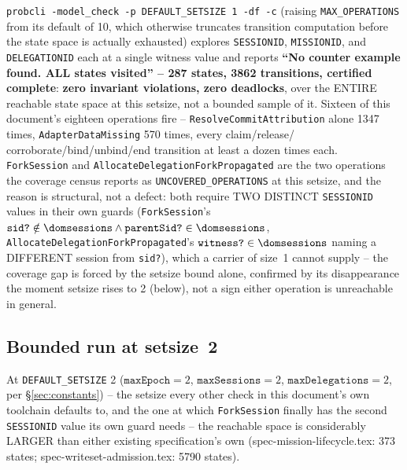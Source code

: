 \documentclass[a4paper,10pt,fleqn]{article}
\newcommand{\field}[1]{\texttt{#1}}
\begin{document}
\texttt{probcli -model\_check -p DEFAULT\_SETSIZE 1 -df -c} (raising
\field{MAX\_OPERATIONS} from its default of 10, which otherwise
truncates transition computation before the state space is actually
exhausted) explores \field{SESSIONID}, \field{MISSIONID}, and
\field{DELEGATIONID} each at a single witness value and reports
\textbf{``No counter example found. ALL states visited'' -- 287
states, 3862 transitions, certified complete}: \textbf{zero invariant
violations, zero deadlocks}, over the ENTIRE reachable state space at
this setsize, not a bounded sample of it. Sixteen of this document's
eighteen operations fire -- \field{ResolveCommitAttribution} alone
1347 times, \field{AdapterDataMissing} 570 times, every claim/release/
corroborate/bind/unbind/end transition at least a dozen times each.
\field{ForkSession} and \field{AllocateDelegationForkPropagated} are
the two operations the coverage census reports as
\texttt{UNCOVERED\_OPERATIONS} at this setsize, and the reason is
structural, not a defect: both require TWO DISTINCT \field{SESSIONID}
values in their own guards (\field{ForkSession}'s
$\field{sid?} \notin \dom \field{sessions} \land \field{parentSid?} \in \dom \field{sessions}$,
\field{AllocateDelegationForkPropagated}'s
$\field{witness?} \in \dom \field{sessions}$ naming a DIFFERENT session from
\field{sid?}), which a carrier of size~1 cannot supply -- the
coverage gap is forced by the setsize bound alone, confirmed by its
disappearance the moment setsize rises to 2 (below), not a sign either
operation is unreachable in general.

\subsection{Bounded run at setsize~2}

At \field{DEFAULT\_SETSIZE} 2 ($\field{maxEpoch} = 2$,
$\field{maxSessions} = 2$, $\field{maxDelegations} = 2$, per
\S\ref{sec:constants}) -- the setsize every other check in this
document's own toolchain defaults to, and the one at which
\field{ForkSession} finally has the second \field{SESSIONID} value its
own guard needs -- the reachable space is considerably LARGER than
either existing specification's own (spec-mission-lifecycle.tex: 373
states; spec-writeset-admission.tex: 5790 states).
\end{document}
